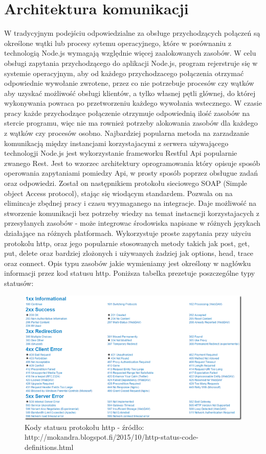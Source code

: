\documentclass[12pt]{report}
\begin{document}
\section{Architektura komunikacji}
W tradycyjnym podejściu odpowiedzialne za obsługe przychodzących połączeń są określone wątki lub procesy sytemu operacyjnego, które w porównaniu z technologią Node.js wymagają względnie więcej zaalokowanych zasobów. 
W celu obsługi zapytania przychodzącego do aplikacji Node.js, program rejerstruje się w systemie operacyjnym, aby od każdego przychodzacego połączenia otrzymać odpowiednie wywołanie zwrotene, przez co nie potrzebuje procesów czy wątków aby uzyskać możliwość obsługi klientów, a tylko własnej pętli glównej, do której wykonywania powraca po przetworzeniu każdego wywołania wstecznego. 
W czasie pracy każde przychodzące połączenie otrzymuje odpowiednią ilość zasobów na stercie programu, więc nie ma rownież potrzeby alokowania zasobów dla każdego z wątków czy procesów osobno. 
Najbardziej popularna metoda na zarzadzanie komunikacją między instancjami korzystajacymi z serwera używającego technologji Node.js jest wykorzystanie frameworku Restful Api popularnie zwanego Rest. 
Jest to wzorzec architektury oprogramowania który opisuje sposób operowania zapytaniami pomiedzy Api, w prosty sposób poprzez obsługue zadań oraz odpowiedzi. 
Został on następnikiem protokołu sieciowego SOAP (Simple object Access protocol), stając się wiodącym standardem. 
Pozwala on na elimincaje zbędnej pracy i czasu wyymaganego na integracje. 
Daje możliwość na stworzenie komunikacji bez potrzeby wiedzy na temat instacncji korzystajacych z przesyłanych zasobów - może integrowac środowiska napisane w różnych językach działające na różnych platformach. 
Wykorzystuje proste zapytania przy użyciu protokolu http, oraz jego popularnie stosowanych metody takich jak post, get, put, delete oraz bardziej zlożonych i używanych żadziej jak options, head, trace oraz connect. 
Opis typu zasobów jakie wymieniamy jest określony w nagłówku informacji przez kod statusu http. 
Poniższa tabelka prezetuje poszczególne typy statusów:

\begin{figure}[!hb]
\centering
\includegraphics[width=\textwidth,height=\textheight,keepaspectratio]{statuses.png} 
\caption{Kody statusu protokołu http - źródło: http://mokandra.blogspot.fi/2015/10/http-status-code-definitions.html}
\end{figure}
\end{document}

